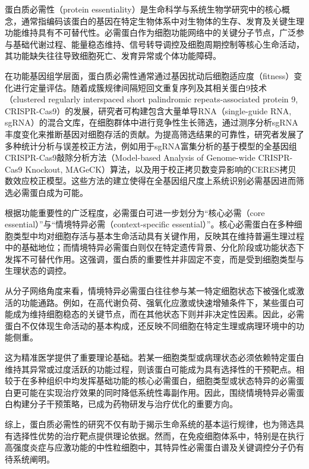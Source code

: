 蛋白质必需性（protein essentiality）是生命科学与系统生物学研究中的核心概念，通常指编码该蛋白的基因在特定生物体系中对生物体的生存、发育及关键生理功能维持具有不可替代性\cite{zhang2016predicting,xiao2015identifying}。必需蛋白作为细胞功能网络中的关键分子节点，广泛参与基础代谢过程、能量稳态维持、信号转导调控及细胞周期控制等核心生命活动，其功能缺失往往导致细胞死亡、发育异常或个体功能障碍\cite{jeong2001lethality}。

在功能基因组学层面，蛋白质必需性通常通过基因扰动后细胞适应度（fitness）变化进行定量评估。随着成簇规律间隔短回文重复序列及其相关蛋白9技术（clustered regularly interspaced short palindromic repeats-associated protein 9, CRISPR-Cas9）的发展，研究者可构建包含大量单导RNA（single-guide RNA, sgRNA）的混合文库，在细胞群体中进行竞争性生长筛选，通过测序分析sgRNA丰度变化来推断基因对细胞存活的贡献\cite{shalem2014genome}。为提高筛选结果的可靠性，研究者发展了多种统计分析与误差校正方法，例如用于sgRNA富集分析的基于模型的全基因组CRISPR-Cas9敲除分析方法（Model-based Analysis of Genome-wide CRISPR-Cas9 Knockout, MAGeCK）算法，以及用于校正拷贝数变异影响的CERES拷贝数效应校正模型\cite{li2014mageck,meyers2017computational}。这些方法的建立使得在全基因组尺度上系统识别必需基因进而筛选必需蛋白成为可能。

根据功能重要性的广泛程度，必需蛋白可进一步划分为“核心必需（core essential）”与“情境特异必需（context-specific essential）”。核心必需蛋白在多种细胞类型中均对细胞存活与基本生命活动具有关键作用，反映其在维持普遍生理过程中的基础地位；而情境特异必需蛋白则仅在特定遗传背景、分化阶段或功能状态下发挥不可替代作用。这强调，蛋白质的重要性并非固定不变，而是受到细胞类型与生理状态的调控\cite{tsherniak2017defining}。

从分子网络角度来看，情境特异必需蛋白往往参与某一特定细胞状态下被强化或激活的功能通路。例如，在高代谢负荷、强氧化应激或快速增殖条件下，某些蛋白可能成为维持细胞稳态的关键节点，而在其他状态下则并非决定性因素。因此，必需蛋白不仅体现生命活动的基本构成，还反映不同细胞在特定生理或病理环境中的功能侧重。

这为精准医学提供了重要理论基础。若某一细胞类型或病理状态必须依赖特定蛋白维持其异常或过度活跃的功能过程，则该蛋白可能成为具有选择性的干预靶点。相较于在多种组织中均发挥基础功能的核心必需蛋白，细胞类型或状态特异的必需蛋白更可能在实现治疗效果的同时降低系统性毒副作用\cite{hart2015high}。因此，围绕情境特异必需蛋白构建分子干预策略，已成为药物研发与治疗优化的重要方向。

综上，蛋白质必需性的研究不仅有助于揭示生命系统的基本运行规律，也为筛选具有选择性优势的治疗靶点提供理论依据。然而，在免疫细胞体系中，特别是在执行高强度炎症与应激功能的中性粒细胞中，其特异性必需蛋白谱及关键调控分子仍有待系统阐明。

